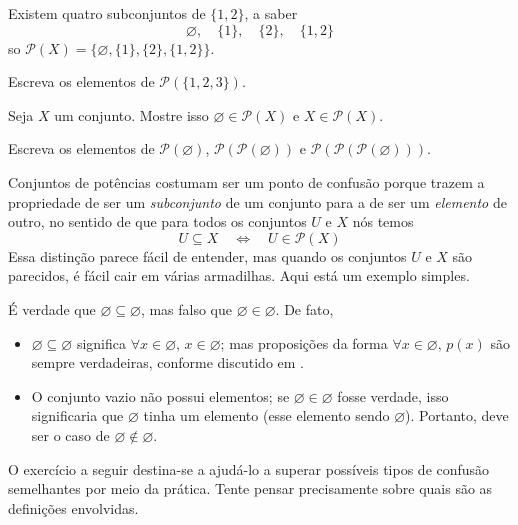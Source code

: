 \begin{example}
Existem quatro subconjuntos de $\{ 1, 2 \}$, a saber
\[ \varnothing, \quad \{ 1 \}, \quad \{ 2 \}, \quad \{ 1, 2 \} \]
so $\mathcal{P}(X) = \{\varnothing, \{ 1 \}, \{ 2 \}, \{ 1, 2 \}\}$.
\end{example}

\begin{exercise}
Escreva os elementos de $\mathcal{P}(\{1, 2, 3\})$.
\end{exercise}

\begin{exercise}
Seja $X$ um conjunto. Mostre isso $\varnothing \in \mathcal{P}(X)$ e $X \in \mathcal{P}(X)$.
\end{exercise}

\begin{exercise}
Escreva os elementos de $\mathcal{P}(\varnothing)$, $\mathcal{P}(\mathcal{P}(\varnothing))$ e $\mathcal{P}(\mathcal{P}(\mathcal{P}(\varnothing)))$.
\end{exercise}

Conjuntos de potências costumam ser um ponto de confusão porque trazem a propriedade de ser um \textit{subconjunto} de um conjunto para a de ser um \textit{elemento} de outro, no sentido de que para todos os conjuntos $U$ e $X $ nós temos
\[ U \subseteq X \quad \Leftrightarrow \quad U \in \mathcal{P}(X) \]
Essa distinção parece fácil de entender, mas quando os conjuntos $U$ e $X$ são parecidos, é fácil cair em várias armadilhas. Aqui está um exemplo simples.

\begin{example}
É verdade que $\varnothing \subseteq \varnothing$, mas falso que $\varnothing \in \varnothing$. De fato,
\begin{itemize}
\item $\varnothing \subseteq \varnothing$ significa $\forall x \in \varnothing,\, x \in \varnothing$; mas proposições da forma $\forall x \in \varnothing,\, p(x)$ são sempre verdadeiras, conforme discutido em .
\item O conjunto vazio não possui elementos; se $\varnothing \in \varnothing$ fosse verdade, isso significaria que $\varnothing$ tinha um elemento (esse elemento sendo $\varnothing$). Portanto, deve ser o caso de $\varnothing \not \in \varnothing$.
\end{itemize}
\end{example}

O exercício a seguir destina-se a ajudá-lo a superar possíveis tipos de confusão semelhantes por meio da prática. Tente pensar precisamente sobre quais são as definições envolvidas.

